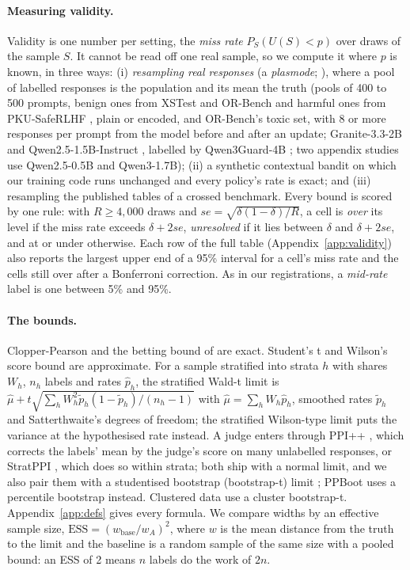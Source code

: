 \documentclass[letterpaper]{article} %
\newcommand{\SWT}{stratified Wald-t limit}
\newcommand{\SWL}{stratified Wilson-type limit}
\begin{document}
\paragraph{Measuring validity.} Validity is one number per setting, the \emph{miss rate} $P_S(U(S)<p)$ over draws of
the sample $S$. It cannot be read off one real sample, so we compute it where $p$ is known, in three ways: (i)
\emph{resampling real responses} (a \emph{plasmode}; \citealp{franklin2014plasmode}), where a pool of labelled responses is the population and
its mean the truth (pools of 400 to 500 prompts, benign ones from XSTest
\citep{rottger2024xstest} and OR-Bench \citep{cui2025orbench} and harmful ones from PKU-SafeRLHF \citep{ji2025pkusaferlhf},
plain or encoded, and OR-Bench's toxic set, with 8 or more responses per prompt from the model before and after an update; Granite-3.3-2B \citep{granite2025} and Qwen2.5-1.5B-Instruct \citep{qwen25}, labelled by
Qwen3Guard-4B \citep{qwen3guard2025}; two appendix studies use Qwen2.5-0.5B and Qwen3-1.7B); (ii) a synthetic contextual bandit on which our training code runs unchanged and
every policy's rate is exact; and (iii) resampling the published tables of a crossed benchmark. Every bound is scored
by one rule: with $R\ge4{,}000$ draws and $se=\sqrt{\delta(1-\delta)/R}$, a cell is \emph{over} its level if the miss
rate exceeds $\delta+2se$, \emph{unresolved} if it lies between $\delta$ and $\delta+2se$, and at or under otherwise.
Each row of the full table (Appendix~\ref{app:validity}) also reports the largest upper end of a 95\% interval for a
cell's miss rate and the cells still over after a Bonferroni correction. As in our registrations, a \emph{mid-rate}
label is one between 5\% and 95\%.

\paragraph{The bounds.} Clopper-Pearson \citep{clopper1934} and the betting bound of \citet{waudbysmith2024betting} are
exact. Student's t and Wilson's score bound are approximate. For a sample stratified into strata $h$ with shares
$W_h$, $n_h$ labels and rates $\hat p_h$, the \SWT{} is
$\hat\mu+t\sqrt{\sum_h W_h^2\tilde p_h(1-\tilde p_h)/(n_h-1)}$ with $\hat\mu=\sum_hW_h\hat p_h$, smoothed rates
$\tilde p_h$ and Satterthwaite's degrees of freedom; the \SWL{} puts the variance at the hypothesised rate instead. A
judge enters through PPI++ \citep{angelopoulos2023ppipp}, which corrects the labels' mean by the judge's score on many
unlabelled responses, or StratPPI \citep{fisch2024stratppi}, which does so within strata; both ship with a normal limit,
and we also pair them with a studentised bootstrap (bootstrap-t) limit \citep{hall1988}; PPBoot \citep{zrnic2024ppboot}
uses a percentile bootstrap instead. Clustered data use a cluster
bootstrap-t. Appendix~\ref{app:defs} gives every formula. We compare widths by an effective sample size,
$\mathrm{ESS}=(w_{\text{base}}/w_A)^2$, where $w$ is the mean distance from the truth to the limit and the baseline is a
random sample of the same size with a pooled bound: an ESS of 2 means $n$ labels do the work of $2n$.
\end{document}
